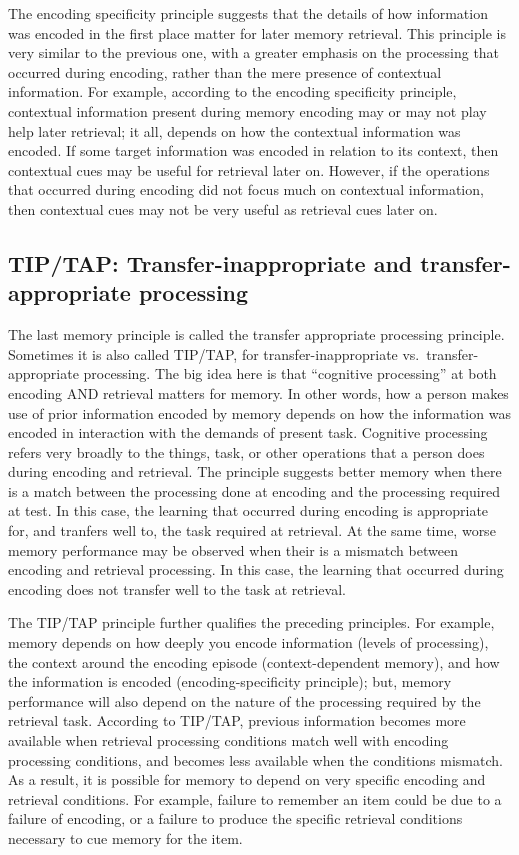 \documentclass[
  oneside,
  12pt]{crumpbook}
\begin{document}
The encoding specificity principle suggests that the details of how information was encoded in the first place matter for later memory retrieval. This principle is very similar to the previous one, with a greater emphasis on the processing that occurred during encoding, rather than the mere presence of contextual information. For example, according to the encoding specificity principle, contextual information present during memory encoding may or may not play help later retrieval; it all, depends on how the contextual information was encoded. If some target information was encoded in relation to its context, then contextual cues may be useful for retrieval later on. However, if the operations that occurred during encoding did not focus much on contextual information, then contextual cues may not be very useful as retrieval cues later on.

\hypertarget{tiptap-transfer-inappropriate-and-transfer-appropriate-processing}{%
\subsection{TIP/TAP: Transfer-inappropriate and transfer-appropriate processing}\label{tiptap-transfer-inappropriate-and-transfer-appropriate-processing}}

The last memory principle is called the transfer appropriate processing principle. Sometimes it is also called TIP/TAP, for transfer-inappropriate vs.~transfer-appropriate processing. The big idea here is that ``cognitive processing'' at both encoding AND retrieval matters for memory. In other words, how a person makes use of prior information encoded by memory depends on how the information was encoded in interaction with the demands of present task. Cognitive processing refers very broadly to the things, task, or other operations that a person does during encoding and retrieval. The principle suggests better memory when there is a match between the processing done at encoding and the processing required at test. In this case, the learning that occurred during encoding is appropriate for, and tranfers well to, the task required at retrieval. At the same time, worse memory performance may be observed when their is a mismatch between encoding and retrieval processing. In this case, the learning that occurred during encoding does not transfer well to the task at retrieval.

The TIP/TAP principle further qualifies the preceding principles. For example, memory depends on how deeply you encode information (levels of processing), the context around the encoding episode (context-dependent memory), and how the information is encoded (encoding-specificity principle); but, memory performance will also depend on the nature of the processing required by the retrieval task. According to TIP/TAP, previous information becomes more available when retrieval processing conditions match well with encoding processing conditions, and becomes less available when the conditions mismatch. As a result, it is possible for memory to depend on very specific encoding and retrieval conditions. For example, failure to remember an item could be due to a failure of encoding, or a failure to produce the specific retrieval conditions necessary to cue memory for the item.
\end{document}
